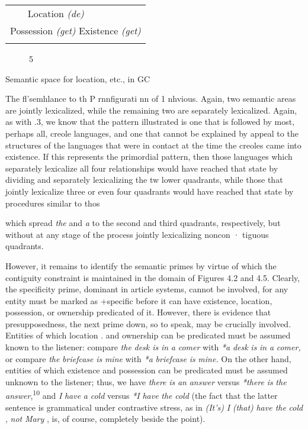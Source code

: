 \begin{tabular}{ll}
\lsptoprule

\multicolumn{1}{l}{Ownership \textit{(a)}} & Location \textit{(}\textit{de)}\\
\multicolumn{2}{l}{Possession \textit{(get) }Existence \textit{(get)}}\\
\lspbottomrule
\end{tabular}
\begin{figure}
\caption{5}
\label{fig:4}
\end{figure}

Semantic space for location, etc., in GC

The fl'semhlance to th P rnnfigurati nn of  1 nhvious. Again, two semantic areas are jointly lexicalized, while the remaining two are separately lexicalized. Again, as with .3, we know that the pattern illustrated is one that is followed by most, perhaps all, creole languages, and one that cannot be explained by appeal to the structures of the languages that were in contact at the time the creoles came into existence. If this represents the primordial pattern, then those languages which separately lexicalize all four relationships would have reached that state by dividing and separately lexicalizing the tw lower quadrants, while those that jointly lexicalize three or even four quadrants would have reached that state by procedures similar to thos

which spread \textit{the} and \textit{a} to the second and third quadrants, respectively, but without at any stage of the process jointly lexicalizing noncon · tiguous quadrants.

However, it remains to identify the semantic primes by virtue of which the contiguity constraint is maintained in the domain of Figures 4.2 and 4.5. Clearly, the specificity prime, dominant in article systems, cannot be involved, for any entity must be marked as +specific before it can have existence, location, possession, or ownership pre\-dicated of it. However, there is evidence that presupposedness, the next prime down, so to speak, may be crucially involved. Entities of which location . and ownership can be predicated must be assumed known to the listener: compare \textit{the} \textit{desk is} \textit{in} \textit{a} \textit{comer} with \textit{*a} \textit{desk} \textit{is} \textit{in} \textit{a} \textit{comer,} or compare \textit{the} \textit{briefcase} \textit{is} \textit{mine} with \textit{*a} \textit{briefcase} \textit{is} \textit{mine.} On the other hand, entities of which existence and possession can be predicated must be assumed unknown to the listener; thus, we have \textit{there} \textit{is} \textit{an} \textit{answer} versus \textit{*there} \textit{is} \textit{the} \textit{answer},\textsuperscript{1}\textsuperscript{0 }and \textit{I} \textit{have} \textit{a} \textit{cold} versus \textit{*I} \textit{have} \textit{the} \textit{cold} (the fact that the latter sentence is grammatical under contrastive stress, as in \textit{(It's)} \textit{I }\textit{(that)} \textit{have the} \textit{cold} , \textit{not} \textit{Mary} , is, of course, completely beside the point). 

